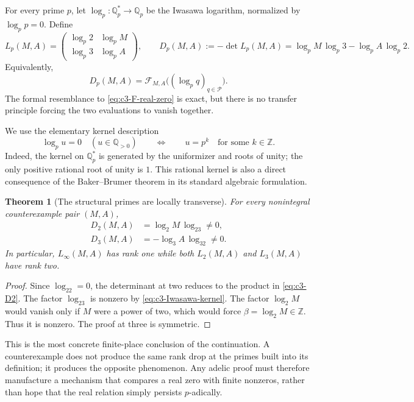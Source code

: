 \documentclass[11pt,oneside]{article}
\newtheorem{theorem}{Theorem}[section]
\theoremstyle{definition}
\theoremstyle{remark}
\newcommand{\Z}{\mathbb Z}
\newcommand{\Q}{\mathbb Q}
\begin{document}
For every prime $p$, let $\log_p:\Q_p^*\to\Q_p$ be the Iwasawa logarithm, normalized by
$\log_p p=0$.  Define
\begin{equation}\label{eq:c3-Dp}
 L_p(M,A)=
 \begin{pmatrix}
   \log_p2&\log_pM\\
   \log_p3&\log_pA
 \end{pmatrix},
 \qquad
 D_p(M,A):=-\det L_p(M,A)
 =\log_pM\,\log_p3-\log_pA\,\log_p2.
\end{equation}
Equivalently,
\begin{equation}\label{eq:c3-Fp-eval}
 D_p(M,A)=
 \mathcal F_{M,A}\bigl((\log_pq)_{q\in\mathcal P}\bigr).
\end{equation}
The formal resemblance to \eqref{eq:c3-F-real-zero} is exact, but there is no transfer
principle forcing the two evaluations to vanish together.

We use the elementary kernel description
\begin{equation}\label{eq:c3-Iwasawa-kernel}
 \log_p u=0\quad(u\in\Q_{>0})
 \qquad\Longleftrightarrow\qquad
 u=p^k\quad\text{for some }k\in\Z.
\end{equation}
Indeed, the kernel on $\Q_p^*$ is generated by the uniformizer and roots of unity; the only
positive rational root of unity is $1$.  This rational kernel is also a direct consequence of
the Baker--Brumer theorem in its standard algebraic formulation.

\begin{theorem}[The structural primes are locally transverse]
\label{thm:c3-base-primes}
For every nonintegral counterexample pair $(M,A)$,
\begin{align}
 D_2(M,A)&=\log_2M\,\log_23\ne0,\label{eq:c3-D2}\\
 D_3(M,A)&=-\log_3A\,\log_32\ne0.\label{eq:c3-D3}
\end{align}
In particular, $L_\infty(M,A)$ has rank one while both $L_2(M,A)$ and $L_3(M,A)$ have rank
two.
\end{theorem}

\begin{proof}
Since $\log_22=0$, the determinant at two reduces to the product in
\eqref{eq:c3-D2}.  The factor $\log_23$ is nonzero by
\eqref{eq:c3-Iwasawa-kernel}.  The factor $\log_2M$ would vanish only if $M$ were a power of
two, which would force $\beta=\log_2M\in\Z$.  Thus it is nonzero.  The proof at three is
symmetric.
\end{proof}

This is the most concrete finite-place conclusion of the continuation.  A counterexample does
not produce the same rank drop at the primes built into its definition; it produces the
opposite phenomenon.  Any adelic proof must therefore manufacture a mechanism that compares
a real zero with finite nonzeros, rather than hope that the real relation simply persists
$p$-adically.
\end{document}
